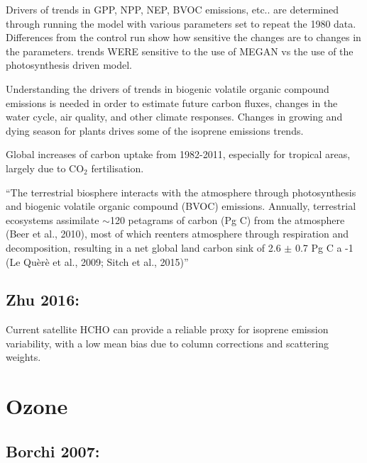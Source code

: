 \documentclass[11pt]{article} %
\begin{document}
    Drivers of trends in GPP, NPP, NEP, BVOC emissions, etc.. are determined through running the model with various parameters set to repeat the 1980 data.
    Differences from the control run show how sensitive the changes are to changes in the parameters.
    trends WERE sensitive to the use of MEGAN vs the use of the photosynthesis driven model.
    
    Understanding the drivers of trends in biogenic volatile organic compound emissions is needed in order to estimate future carbon fluxes, changes in the water cycle, air quality, and other climate responses.
    Changes in growing and dying season for plants drives some of the isoprene emissions trends.
    
    Global increases of carbon uptake from 1982-2011, especially for tropical areas, largely due to CO$_2$ fertilisation.
    
    ``The terrestrial biosphere interacts with the atmosphere through photosynthesis and biogenic volatile organic compound (BVOC) emissions. Annually, terrestrial ecosystems assimilate $\sim$120 petagrams of carbon (Pg C) from the atmosphere (Beer et al., 2010), most of which reenters atmosphere through respiration and decomposition, resulting in a net global land carbon sink of 2.6 $\pm$ 0.7 Pg C a -1 (Le Quèrè et al., 2009; Sitch et al., 2015)''
    
  \subsection{Zhu 2016: }
    \citet{Zhu2016}
    Current satellite HCHO can provide a reliable proxy for isoprene emission variability, with a low mean bias due to column corrections and scattering weights.
    


\section{Ozone}
  \subsection{Borchi 2007:}
\end{document}
